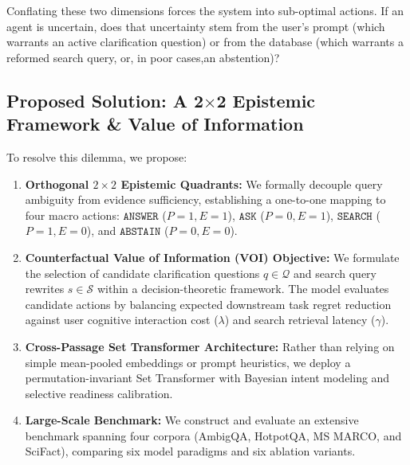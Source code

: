 Conflating these two dimensions forces the system into sub-optimal actions. If an agent is uncertain, does that uncertainty stem from the user's prompt (which warrants an active clarification question) or from the database (which warrants a reformed search query, or, in poor cases,an abstention)?

\subsection{Proposed Solution: A 2$\times$2 Epistemic Framework \& Value of Information}
To resolve this dilemma, we propose:
\begin{enumerate}
    \item \textbf{Orthogonal $2 \times 2$ Epistemic Quadrants:} We formally decouple query ambiguity from evidence sufficiency, establishing a one-to-one mapping to four macro actions: $\texttt{ANSWER}$ ($P=1, E=1$), $\texttt{ASK}$ ($P=0, E=1$), $\texttt{SEARCH}$ ($P=1, E=0$), and $\texttt{ABSTAIN}$ ($P=0, E=0$).
    \item \textbf{Counterfactual Value of Information (VOI) Objective:} We formulate the selection of candidate clarification questions $q \in \mathcal{Q}$ and search query rewrites $s \in \mathcal{S}$ within a decision-theoretic framework. The model evaluates candidate actions by balancing expected downstream task regret reduction against user cognitive interaction cost ($\lambda$) and search retrieval latency ($\gamma$).
    \item \textbf{Cross-Passage Set Transformer Architecture:} Rather than relying on simple mean-pooled embeddings or prompt heuristics, we deploy a permutation-invariant Set Transformer \cite{lee2019set} with Bayesian intent modeling and selective readiness calibration.
    \item \textbf{Large-Scale Benchmark:} We construct and evaluate an extensive benchmark spanning four corpora (AmbigQA, HotpotQA, MS MARCO, and SciFact), comparing six model paradigms and six ablation variants.
\end{enumerate}
